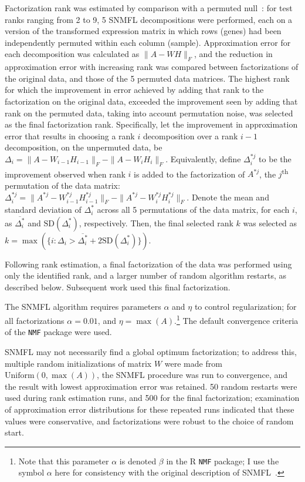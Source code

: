 \documentclass[dissertation.tex]{subfiles}
\begin{document}
Factorization rank was estimated by comparison with a permuted null~\cite{Frigyesi2008}: for test ranks ranging from 2 to 9, 5 \gls{SNMFL} decompositions were performed, each on a version of the transformed expression matrix in which rows (genes) had been independently permuted within each column (sample).  Approximation error for each decomposition was calculated as $\|A - W H\|_F$, and the reduction in approximation error with increasing rank was compared between factorizations of the original data, and those of the 5 permuted data matrices.  The highest rank for which the improvement in error achieved by adding that rank to the factorization on the original data, exceeded the improvement seen by adding that rank on the permuted data, taking into account permutation noise, was selected as the final factorization rank.  Specifically, let the improvement in approximation error that results in choosing a rank $i$ decomposition over a rank $i-1$ decomposition, on the unpermuted data, be $\Delta_i = \|A - W_{i-1} H_{i-1}\|_F - \|A - W_{i} H_{i}\|_F$.  Equivalently, define $\Delta^{*j}_i$ to be the improvement observed when rank $i$ is added to the factorization of $A^{*j}$, the $j$\textsuperscript{th} permutation of the data matrix: $\Delta^{*j}_i = \|A^{*j} - W^{*j}_{i-1} H^{*j}_{i-1}\|_F - \|A^{*j} - W^{*j}_{i} H^{*j}_{i}\|_F$.  Denote the mean and standard deviation of $\Delta^{*}_i$ across all 5 permutations of the data matrix, for each $i$, as $\overline{\Delta^{*}_i}$ and $\text{SD}(\Delta^{*}_i)$, respectively.  Then, the final selected rank $k$ was selected as $k = \max(\{i : \Delta_i > \overline{\Delta^{*}_i} + 2 \text{SD}(\Delta^{*}_i)\})$.

Following rank estimation, a final factorization of the data was performed using only the identified rank, and a larger number of random algorithm restarts, as described below.  Subsequent work used this final factorization.

The \gls{SNMFL} algorithm requires parameters $\alpha$ and $\eta$ to control regularization; for all factorizations $\alpha = 0.01$, and $\eta = \max(A)$.\footnote{Note that this parameter $\alpha$ is denoted $\beta$ in the R \texttt{NMF} package; I use the symbol $\alpha$ here for consistency with the original description of \gls{SNMFL}~\cite{Kim2007}.}  The default convergence criteria of the \texttt{NMF} package were used.

\gls{SNMFL} may not necessarily find a global optimum factorization; to address this, multiple random initializations of matrix $W$ were made from $\text{Uniform}(0, \max(A))$, the \gls{SNMFL} procedure was run to convergence, and the result with lowest approximation error was retained.  50 random restarts were used during rank estimation runs, and 500 for the final factorization; examination of approximation error distributions for these repeated runs indicated that these values were conservative, and factorizations were robust to the choice of random start.
\end{document}
